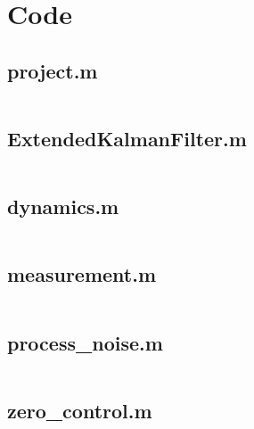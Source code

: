 \documentclass{article}
\begin{document}




\nocite{*}
\printbibliography


\section{Code}

\subsection{project.m}

\inputminted{matlab}{project.m}

\subsection{ExtendedKalmanFilter.m}

\inputminted{matlab}{ExtendedKalmanFilter.m}

\subsection{dynamics.m}

\inputminted{matlab}{dynamics.m}

\subsection{measurement.m}

\inputminted{matlab}{measurement.m}

\subsection{process\_noise.m}

\inputminted{matlab}{process_noise.m}

\subsection{zero\_control.m}

\inputminted{matlab}{zero_control.m}
\end{document}
